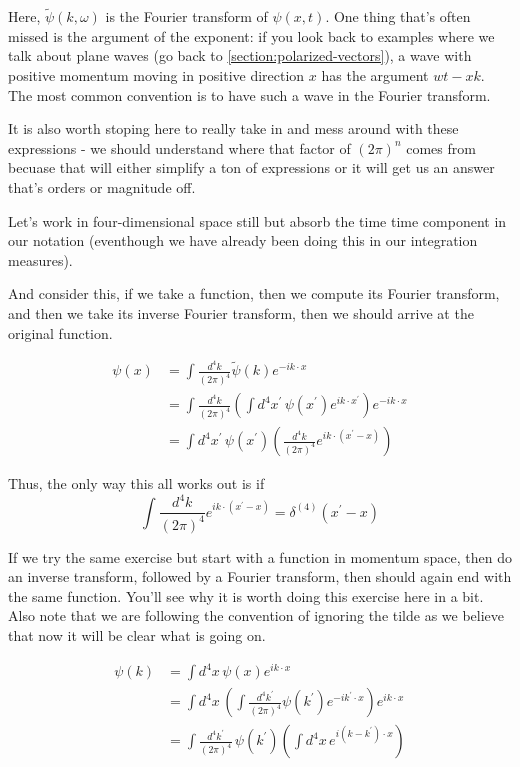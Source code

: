 Here, $\tilde{\psi}(k, \omega)$ is the Fourier transform of $\psi(x, t)$.
One thing that's often missed is the argument of the exponent: if you look back to examples where we talk about plane waves
(go back to \ref{section:polarized-vectors}), a wave with positive momentum moving in positive direction $x$ has the argument $wt - xk$.
The most common convention is to have such a wave in the Fourier transform.

It is also worth stoping here to really take in and mess around with these expressions - we should understand
where that factor of $\left(2\pi\right)^n$ comes from becuase that will either simplify a ton
of expressions or it will get us an answer that's orders or magnitude off.

Let's work in four-dimensional space still but absorb the time time component in our notation
(eventhough we have already been doing this in our integration measures).

And consider this, if we take a function, then we compute its Fourier transform, and then we take its inverse
Fourier transform, then we should arrive at the original function.

\begin{align*}
\psi(x) &= \int \frac{d^4 k}{\left(2\pi\right)^4} \tilde{\psi}(k) e^{-ik\cdot x} \\
&= \int \frac{d^4 k}{\left(2\pi\right)^4}
    \left( \int d^4x^{\prime} \, \psi(x^\prime) e^{ik\cdot x^{\prime}} \right)
    e^{-ik\cdot x} \\
&= \int d^4x^{\prime} \, \psi(x^\prime)
    \left( \frac{d^4 k}{\left(2\pi\right)^4}  e^{ik\cdot \left(x^{\prime} - x\right)} \right)
\end{align*}

Thus, the only way this all works out is if
$$
\int \frac{d^4 k}{\left(2\pi\right)^4}  e^{ik\cdot \left(x^{\prime} - x\right)}
= \delta^{(4)} \left( x^{\prime} - x \right)
$$

If we try the same exercise but start with a function in momentum space, then do an inverse transform, followed by a Fourier
transform, then should again end with the same function.
You'll see why it is worth doing this exercise here in a bit.
Also note that we are following the convention of ignoring the tilde as we believe that now it will be clear
what is going on.

\begin{align*}
\psi(k) &= \int d^4 x \, \psi(x) e^{ik\cdot x} \\
&= \int d^4 x \, 
    \left( \int \frac{d^4 k^\prime}{\left(2\pi\right)^4} \psi(k^\prime) e^{-ik^\prime \cdot x} \right)
    e^{ik\cdot x} \\
&= \int \frac{d^4 k^\prime}{\left(2\pi\right)^4} \,\psi(k^\prime)
    \left( \int d^4 x \, e^{i(k - k^\prime)\cdot x} \right)
\end{align*}

